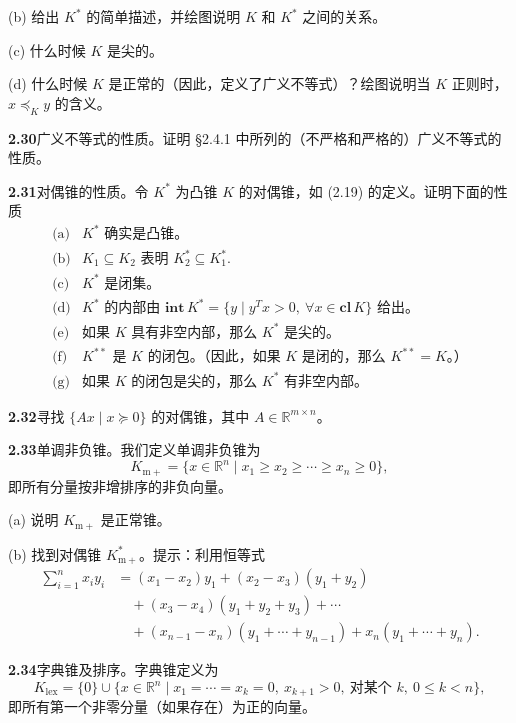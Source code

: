 \documentclass[UTF8,12pt,a4paper,fontset=fandol]{ctexart}
\begin{document}
\noindent(b) 给出 $K^*$ 的简单描述，并绘图说明 $K$ 和 $K^*$ 之间的关系。

\noindent(c) 什么时候 $K$ 是尖的。

\noindent(d) 什么时候 $K$ 是正常的（因此，定义了广义不等式）？绘图说明当 $K$ 正则时，$x\preceq_K y$ 的含义。

\noindent\textbf{2.30}\quad 广义不等式的性质。证明 \S2.4.1 中所列的（不严格和严格的）广义不等式的性质。

\noindent\textbf{2.31}\quad 对偶锥的性质。令 $K^*$ 为凸锥 $K$ 的对偶锥，如 (2.19) 的定义。证明下面的性质
\[
  \begin{array}{ll}
  \text{(a)} & K^*\text{ 确实是凸锥。}\\
  \text{(b)} & K_1\subseteq K_2\text{ 表明 }K_2^*\subseteq K_1^*.\\
  \text{(c)} & K^*\text{ 是闭集。}\\
  \text{(d)} & K^*\text{ 的内部由 }\mathbf{int}\,K^*=\{y\mid y^Tx>0,\ \forall x\in\mathbf{cl}\,K\}\text{ 给出。}\\
  \text{(e)} & \text{如果 }K\text{ 具有非空内部，那么 }K^*\text{ 是尖的。}\\
  \text{(f)} & K^{**}\text{ 是 }K\text{ 的闭包。（因此，如果 }K\text{ 是闭的，那么 }K^{**}=K\text{。）}\\
  \text{(g)} & \text{如果 }K\text{ 的闭包是尖的，那么 }K^*\text{ 有非空内部。}
  \end{array}
\]

\noindent\textbf{2.32}\quad 寻找 $\{Ax\mid x\succeq0\}$ 的对偶锥，其中 $A\in\mathbb{R}^{m\times n}$。

\noindent\textbf{2.33}\quad 单调非负锥。我们定义单调非负锥为
\[
  K_{\mathrm{m}+}=\{x\in\mathbb{R}^n\mid x_1\ge x_2\ge\cdots\ge x_n\ge0\},
\]
即所有分量按非增排序的非负向量。

\noindent(a) 说明 $K_{\mathrm{m}+}$ 是正常锥。

\noindent(b) 找到对偶锥 $K_{\mathrm{m}+}^*$。提示：利用恒等式
\begin{align*}
  \sum_{i=1}^n x_iy_i
  &= (x_1-x_2)y_1+(x_2-x_3)(y_1+y_2)\\
  &\quad +(x_3-x_4)(y_1+y_2+y_3)+\cdots\\
  &\quad +(x_{n-1}-x_n)(y_1+\cdots+y_{n-1})+x_n(y_1+\cdots+y_n).
\end{align*}

\noindent\textbf{2.34}\quad 字典锥及排序。字典锥定义为
\[
  K_{\mathrm{lex}}=\{0\}\cup\{x\in\mathbb{R}^n\mid x_1=\cdots=x_k=0,\ x_{k+1}>0,\ \text{对某个 }k,\ 0\le k<n\},
\]
即所有第一个非零分量（如果存在）为正的向量。
\end{document}

